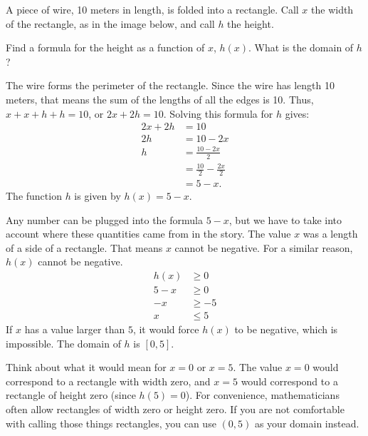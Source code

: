 \documentclass[nooutcomes]{ximera}
\begin{document}
	\begin{example}\label{examp:wirePerimeterDomain}
		A piece of wire, 10 meters in length, is folded into a rectangle. Call $x$ the width of the rectangle, as in the image below, and call $h$ the height.
		\begin{image}
		\end{image}
		Find a formula for the height as a function of $x$, $h(x)$. What is the domain of $h$?
		
		\begin{explanation}
		
			The wire forms the perimeter of the rectangle. Since the wire has length 10 meters, that means the sum of the lengths of all the edges is 10. Thus, $x + x + h + h = 10$, or 				$2x + 2h = 10$. Solving this formula 
			for $h$ gives:
			\begin{align*}
				2x + 2h &= 10\\
				2h &= 10 - 2x\\
				h &= \frac{10-2x}{2}\\
					&= \frac{10}{2}-\frac{2x}{2}\\
					&= 5 - x.
			\end{align*}
			The function $h$ is given by $h(x) = 5-x$.
			
			Any number can be plugged into the formula $5-x$, but we have to take into account where these quantities came from in the story.
			The value $x$ was a length of a side of a rectangle. That means $x$ cannot be negative. For a similar reason, $h(x)$ cannot be negative.
			\begin{align*}
				h(x) & \geq 0\\
				5-x & \geq 0\\
				-x & \geq -5\\
				x &\leq 5
			\end{align*}	
			If $x$ has a value larger than $5$, it would force $h(x)$ to be negative, which is impossible. The domain of $h$ is $[0, 5]$.

			\begin{callout}
				Think about what it would mean for $x=0$ or $x=5$. The value $x=0$ would correspond to a rectangle with width zero, and $x=5$ 	
				would correspond to a rectangle of height zero (since $h(5)=0$). For convenience, mathematicians often allow rectangles of width 
				zero or height zero. If you are not comfortable with calling those things rectangles, you can use $(0,5)$ as your domain instead.
			\end{callout}
		\end{explanation}
	
	\end{example}
	
\end{document}
